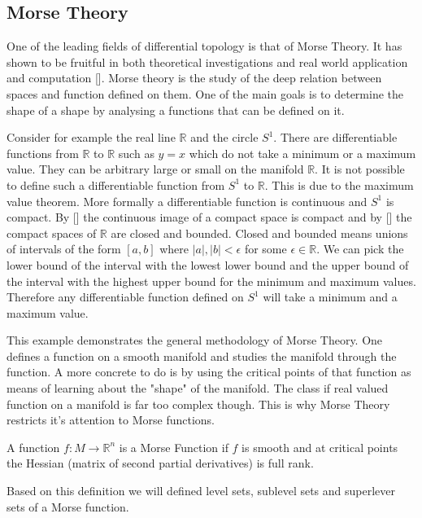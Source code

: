 \subsection{Morse Theory}

One of the leading fields of differential topology is that of Morse Theory. It has shown to be fruitful in both theoretical investigations and real world application and computation []. Morse theory is the study of the deep relation between spaces and function defined on them. One of the main goals is to determine the shape of a shape by analysing a functions that can be defined on it. 

Consider for example the real line $\mathbb{R}$ and the circle $S^1$. There are differentiable functions from $\mathbb{R}$ to $\mathbb{R}$ such as $y = x$ which do not take a minimum or a maximum value. They can be arbitrary large or small on the manifold $\mathbb{R}$. It is not possible to define such a differentiable function from $S^1$ to $\mathbb{R}$. This is due to the maximum value theorem. More formally a differentiable function is continuous and $S^1$ is compact. By [] the continuous image of a compact space is compact and by [] the compact spaces of $\mathbb{R}$ are closed and bounded. Closed and bounded means unions of intervals of the form $[a, b]$ where $|a|, |b| < \epsilon$ for some $\epsilon \in \mathbb{R}$. We can pick the lower bound of the interval with the lowest lower bound and the upper bound of the interval with the highest upper bound for the minimum and maximum values. Therefore any differentiable function defined on $S^1$ will take a minimum and a maximum value.

This example demonstrates the general methodology of Morse Theory. One defines a function on a smooth manifold and studies the manifold through the function. A more concrete to do is by using the critical points of that function as means of learning about the "shape" of the manifold. The class if real valued function on a manifold is far too complex though. This is why Morse Theory restricts it's attention to Morse functions.


\begin{defn} A function $f: M \to \mathbb{R}^n$ is a Morse Function if $f$ is smooth and at critical points the Hessian (matrix of second partial derivatives) is full rank.   \end{defn}

Based on this definition we will defined level sets, sublevel sets and superlever sets of a Morse function.


